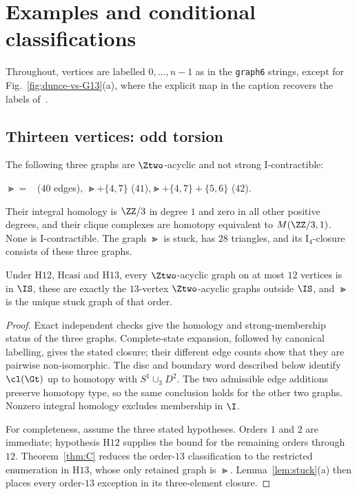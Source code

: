 \section{Examples and conditional classifications}\label{sec:examples}

Throughout, vertices are labelled $0,\dots,n-1$ as in the \texttt{graph6} strings, except for Fig.~\ref{fig:dunce-vs-G13}(a), where the explicit map in the caption recovers the labels of~\cite{DEFH2023}.

\subsection{Thirteen vertices: odd torsion}\label{sec:thirteen}

\begin{theorem}\label{thm:A}
The following three graphs are $\Ztwo$-acyclic and not strong I-contractible:
\begin{center}\small
$\Gt=$ \ ($40$ edges),\qquad
$\Gt+\{4,7\}$ ($41$),\qquad $\Gt+\{4,7\}+\{5,6\}$ ($42$).
\end{center}
Their integral homology is $\ZZ/3$ in degree $1$ and zero in all other positive degrees, and their clique complexes are homotopy equivalent to $M(\ZZ/3,1)$. None is I-contractible. The graph $\Gt$ is stuck, has $28$ triangles, and its $\mathrm{I}_4$-closure consists of these three graphs.

Under $\mathrm{H12}$, $\mathrm{Hcasi}$ and $\mathrm{H13}$, every $\Ztwo$-acyclic graph on at most $12$ vertices is in $\IS$, these are exactly the $13$-vertex $\Ztwo$-acyclic graphs outside $\IS$, and $\Gt$ is the unique stuck graph of that order.
\end{theorem}
\begin{proof}
Exact independent checks give the homology and strong-membership status of the three graphs. Complete-state expansion, followed by canonical labelling, gives the stated closure; their different edge counts show that they are pairwise non-isomorphic. The disc and boundary word described below identify $\cl(\Gt)$ up to homotopy with $S^1\cup_3D^2$. The two admissible edge additions preserve homotopy type, so the same conclusion holds for the other two graphs. Nonzero integral homology excludes membership in $\I$.

For completeness, assume the three stated hypotheses. Orders $1$ and $2$ are immediate; hypothesis $\mathrm{H12}$ supplies the bound for the remaining orders through $12$. Theorem~\ref{thm:C} reduces the order-$13$ classification to the restricted enumeration in $\mathrm{H13}$, whose only retained graph is $\Gt$. Lemma~\ref{lem:stuck}(a) then places every order-$13$ exception in its three-element closure.
\end{proof}

